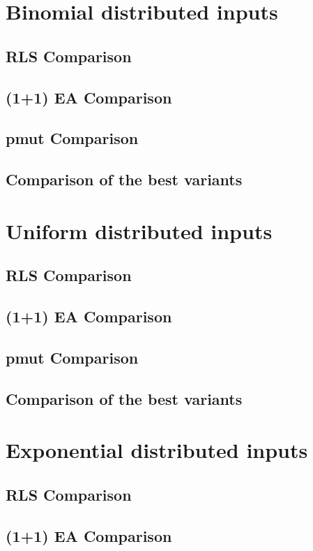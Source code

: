 \section{Binomial distributed inputs}
\subsection{RLS Comparison}
\subsection{(1+1) EA Comparison}
\subsection{pmut Comparison}
\subsection{Comparison of the best variants}

\section{Uniform distributed inputs}
\subsection{RLS Comparison}
\subsection{(1+1) EA Comparison}
\subsection{pmut Comparison}
\subsection{Comparison of the best variants}

\section{Exponential distributed inputs}
\subsection{RLS Comparison}
\subsection{(1+1) EA Comparison}
